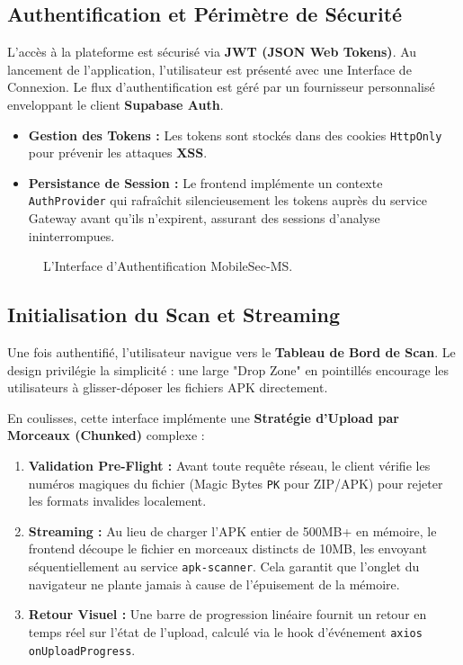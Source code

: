 \documentclass[
  journal=largetwo,
  manuscript=article-type,
  year=2025,
  volume=1,
]{cup-journal}
\begin{document}
\subsection{Authentification et Périmètre de Sécurité}
L'accès à la plateforme est sécurisé via \textbf{JWT (JSON Web Tokens)}. Au lancement de l'application, l'utilisateur est présenté avec une Interface de Connexion. Le flux d'authentification est géré par un fournisseur personnalisé enveloppant le client \textbf{Supabase Auth}.

\begin{itemize}
    \item \textbf{Gestion des Tokens :} Les tokens sont stockés dans des cookies \texttt{HttpOnly} pour prévenir les attaques \textbf{XSS}.
    \item \textbf{Persistance de Session :} Le frontend implémente un contexte \texttt{AuthProvider} qui rafraîchit silencieusement les tokens auprès du service Gateway avant qu'ils n'expirent, assurant des sessions d'analyse ininterrompues.
\end{itemize}

\begin{figure}
\centering
{}
\caption{L'Interface d'Authentification MobileSec-MS.}
\label{fig:login}
\end{figure}

\subsection{Initialisation du Scan et Streaming}
Une fois authentifié, l'utilisateur navigue vers le \textbf{Tableau de Bord de Scan}. Le design privilégie la simplicité : une large "Drop Zone" en pointillés encourage les utilisateurs à glisser-déposer les fichiers APK directement.

En coulisses, cette interface implémente une \textbf{Stratégie d'Upload par Morceaux (Chunked)} complexe :
\begin{enumerate}
    \item \textbf{Validation Pre-Flight :} Avant toute requête réseau, le client vérifie les numéros magiques du fichier (Magic Bytes \texttt{PK} pour ZIP/APK) pour rejeter les formats invalides localement.
    \item \textbf{Streaming :} Au lieu de charger l'APK entier de 500MB+ en mémoire, le frontend découpe le fichier en morceaux distincts de 10MB, les envoyant séquentiellement au service \texttt{apk-scanner}. Cela garantit que l'onglet du navigateur ne plante jamais à cause de l'épuisement de la mémoire.
    \item \textbf{Retour Visuel :} Une barre de progression linéaire fournit un retour en temps réel sur l'état de l'upload, calculé via le hook d'événement \texttt{axios} \texttt{onUploadProgress}.
\end{enumerate}
\end{document}
